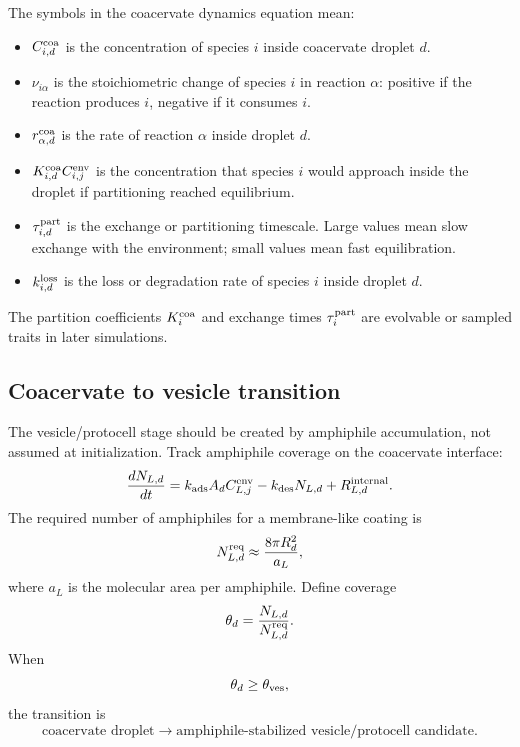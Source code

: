 \documentclass[11pt]{article}
\begin{document}
The symbols in the coacervate dynamics equation mean:
\begin{itemize}
  \item $C_{i,d}^{\rm coa}$ is the concentration of species $i$ inside
  coacervate droplet $d$.
  \item $\nu_{i\alpha}$ is the stoichiometric change of species $i$ in reaction
  $\alpha$: positive if the reaction produces $i$, negative if it consumes $i$.
  \item $r_{\alpha,d}^{\rm coa}$ is the rate of reaction $\alpha$ inside
  droplet $d$.
  \item $K_{i,d}^{\rm coa}C_{i,j}^{\rm env}$ is the concentration that species
  $i$ would approach inside the droplet if partitioning reached equilibrium.
  \item $\tau_{i,d}^{\rm part}$ is the exchange or partitioning timescale. Large
  values mean slow exchange with the environment; small values mean fast
  equilibration.
  \item $k_{i,d}^{\rm loss}$ is the loss or degradation rate of species $i$
  inside droplet $d$.
\end{itemize}

The partition coefficients $K_i^{\rm coa}$ and exchange times
$\tau_i^{\rm part}$ are evolvable or sampled traits in later simulations.

\subsection{Coacervate to vesicle transition}

The vesicle/protocell stage should be created by amphiphile accumulation, not
assumed at initialization. Track amphiphile coverage on the coacervate
interface:
\begin{equation}
\frac{dN_{L,d}}{dt}
=
k_{\rm ads}A_d C_{L,j}^{\rm env}
-
k_{\rm des}N_{L,d}
+
R_{L,d}^{\rm internal}.
\end{equation}
The required number of amphiphiles for a membrane-like coating is
\begin{equation}
N_{L,d}^{\rm req}
\approx
\frac{8\pi R_d^2}{a_L},
\end{equation}
where $a_L$ is the molecular area per amphiphile. Define coverage
\begin{equation}
\theta_d=\frac{N_{L,d}}{N_{L,d}^{\rm req}}.
\end{equation}
When
\begin{equation}
\theta_d \geq \theta_{\rm ves},
\end{equation}
the transition is
\begin{equation}
\text{coacervate droplet}
\rightarrow
\text{amphiphile-stabilized vesicle/protocell candidate}.
\end{equation}
\end{document}
